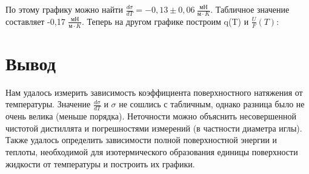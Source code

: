 \documentclass[a4paper, 12pt]{article}
\begin{document}
		По этому графику можно найти $\frac{d \sigma}{dT} = -0,13 \pm 0,06\: \frac{мН}{м \cdot K}$. Табличное значение составляет -0,17 $\frac{мН}{м \cdot K}$. Теперь на другом графике построим q(T) и $\frac{U}{F} (T)$: \newpage
		\begin{figure}[h]
		\end{figure}
        \begin{figure}[h]
		\end{figure}
	\section*{Вывод}
		Нам удалось измерить зависимость коэффициента поверхностного натяжения от температуры. Значение $\frac{d \sigma}{dT}$ и $\sigma$ не сошлись с табличным, однако разница было не очень велика (меньше порядка). Неточности можно объяснить несовершенной чистотой дистиллята и погрешностями измерений (в частности диаметра иглы). Также удалось определить зависимости полной поверхностной энергии и теплоты, необходимой для изотермического образования единицы поверхности жидкости от температуры и построить их графики. 
\end{document}
